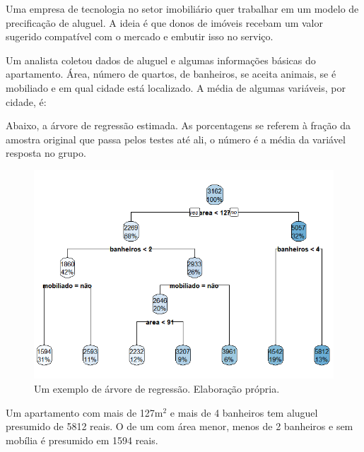 \begin{exemplo}[Regressão]
 Uma empresa de tecnologia no setor imobiliário quer trabalhar em um modelo de precificação de aluguel. A ideia é que donos de imóveis recebam um valor sugerido compatível com o mercado e embutir isso no serviço.
 
 Um analista coletou dados de aluguel e algumas informações básicas do apartamento. Área, número de quartos, de banheiros, se aceita animais, se é mobiliado e em qual cidade está localizado. A média de algumas variáveis, por cidade, é:
 
 \begin{center}
      

 \end{center}
 
Abaixo, a árvore de regressão estimada. As porcentagens se referem à fração da amostra original que passa pelos testes até ali, o número é a média da variável resposta no grupo. 
 
 \begin{figure}[H]
    \centering
    \includegraphics[scale = .75]{imagens/arvore_decisao_houses.png}
    \caption{Um exemplo de árvore de regressão. Elaboração própria.}
    \label{fig:arvore_reg}
\end{figure}


Um apartamento com mais de 127m$^2$ e mais de 4 banheiros tem aluguel presumido de 5812 reais. O de um com área menor, menos de 2 banheiros e sem mobília é presumido em 1594 reais.
 
 
\end{exemplo}





